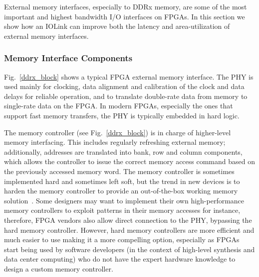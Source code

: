 

External memory interfaces, especially to DDRx memory, are some of the most important and highest bandwidth I/O interfaces on FPGAs.
In this section we show how an IOLink can improve both the latency and area-utilization of external memory interfaces.

%
\subsubsection{Memory Interface Components}
%

%
%

Fig.~\ref{ddrx_block} shows a typical FPGA external memory interface.
The PHY is used mainly for clocking, data alignment and calibration of the clock and data delays for reliable operation, and to translate double-rate data from memory to single-rate data on the FPGA.
In modern FPGAs, especially the ones that support fast memory transfers, the PHY is typically embedded in hard logic.

The memory controller (see Fig.~\ref{ddrx_block}) is in charge of higher-level memory interfacing.
This includes regularly refreshing external memory; %
additionally, addresses are translated into bank, row and column components, which allows the controller to issue the correct memory access command based on the previously accessed memory word.
The memory controller is sometimes implemented hard and sometimes left soft, but the trend in new devices is to harden the memory controller to provide an out-of-the-box working memory solution~\cite{emif}.
Some designers may want to implement their own high-performance memory controllers to exploit patterns in their memory accesses for instance, therefore, FPGA vendors also allow direct connection to the PHY, bypassing the hard memory controller.
However, hard memory controllers are more efficient and much easier to use making it a more compelling option, especially as FPGAs start being used by software developers (in the context of high-level synthesis and data center computing) who do not have the expert hardware knowledge to design a custom memory controller.

